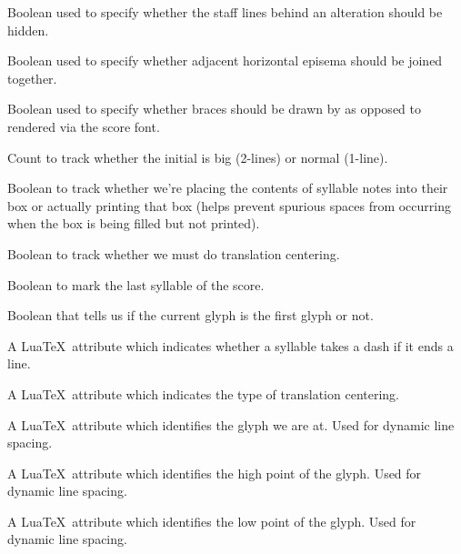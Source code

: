 Boolean used to specify whether the staff lines behind an alteration should be hidden.

Boolean used to specify whether adjacent horizontal episema should be joined together.

Boolean used to specify whether braces should be drawn by \MP{} as
opposed to rendered via the score font.

Count to track whether the initial is big (2-lines) or normal (1-line).

Boolean to track whether we're placing the contents of syllable notes into their box or actually printing that box (helps prevent spurious spaces from occurring when the box is being filled but not printed).

Boolean to track whether we must do translation centering.

Boolean to mark the last syllable of the score.

Boolean that tells us if the current glyph is the first glyph or not.

A Lua\TeX\ attribute which indicates whether a syllable takes a dash if it ends a line.  

A Lua\TeX\ attribute which indicates the type of translation centering.

A Lua\TeX\ attribute which identifies the glyph we are at.  Used for dynamic line spacing.

A Lua\TeX\ attribute which identifies the high point of the glyph.  Used for dynamic line spacing.

A Lua\TeX\ attribute which identifies the low point of the glyph.  Used for dynamic line spacing.

